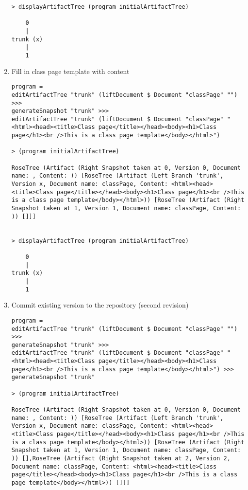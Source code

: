 \documentclass[11pt]{article}
\begin{document}
\begin{enumerate}
\begin{lstlisting}
> displayArtifactTree (program initialArtifactTree)

    0    
    |    
trunk (x)
    |    
    1  

\end{lstlisting}

\item Fill in class page template with content 
\begin{lstlisting}
program = 
editArtifactTree "trunk" (liftDocument $ Document "classPage" "") >>> 
generateSnapshot "trunk" >>> 
editArtifactTree "trunk" (liftDocument $ Document "classPage" "<html><head><title>Class page</title></head><body><h1>Class page</h1><br />This is a class page template</body></html>") 

> (program initialArtifactTree)

RoseTree (Artifact (Right Snapshot taken at 0, Version 0, Document name: , Content: )) [RoseTree (Artifact (Left Branch 'trunk', Version x, Document name: classPage, Content: <html><head><title>Class page</title></head><body><h1>Class page</h1><br />This is a class page template</body></html>)) [RoseTree (Artifact (Right Snapshot taken at 1, Version 1, Document name: classPage, Content: )) []]]


> displayArtifactTree (program initialArtifactTree)

    0    
    |    
trunk (x)
    |    
    1 

\end{lstlisting}
\item Commit existing version to the repository (second revision)
\begin{lstlisting}
program = 
editArtifactTree "trunk" (liftDocument $ Document "classPage" "") >>> 
generateSnapshot "trunk" >>> 
editArtifactTree "trunk" (liftDocument $ Document "classPage" "<html><head><title>Class page</title></head><body><h1>Class page</h1><br />This is a class page template</body></html>") >>> 
generateSnapshot "trunk"

> (program initialArtifactTree)

RoseTree (Artifact (Right Snapshot taken at 0, Version 0, Document name: , Content: )) [RoseTree (Artifact (Left Branch 'trunk', Version x, Document name: classPage, Content: <html><head><title>Class page</title></head><body><h1>Class page</h1><br />This is a class page template</body></html>)) [RoseTree (Artifact (Right Snapshot taken at 1, Version 1, Document name: classPage, Content: )) [],RoseTree (Artifact (Right Snapshot taken at 2, Version 2, Document name: classPage, Content: <html><head><title>Class page</title></head><body><h1>Class page</h1><br />This is a class page template</body></html>)) []]]



\end{lstlisting}
\end{enumerate}
\end{document}
